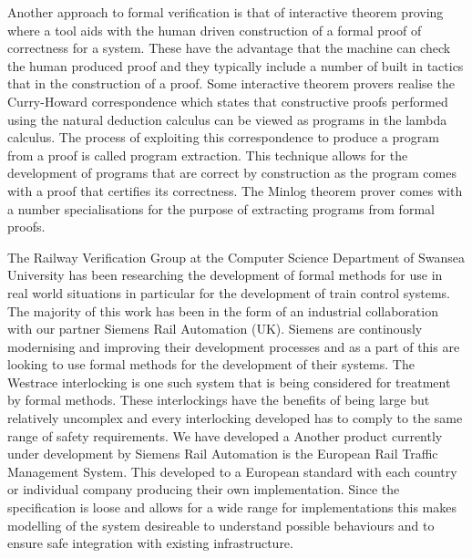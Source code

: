Another approach to formal verification is that of interactive theorem proving where a tool aids with the human driven construction of a formal proof of correctness for a system. These have the advantage that the machine can check the human produced proof and they typically include a number of built in tactics that in the construction of a proof. Some interactive theorem provers realise the Curry-Howard correspondence \cite{} which states that constructive proofs performed using the natural deduction calculus can be viewed as programs in the lambda calculus.  The process of exploiting this correspondence to produce a program from a proof is called program extraction. This technique allows for the development of programs that are correct by construction as the program comes with a proof that certifies its correctness. The Minlog theorem prover comes with a number specialisations for the purpose of extracting programs from formal proofs.
\begin{comment}
\textbf{Note: Add something about program extraction here.}
Alternatively to automatic techniques for verification there are also interactive theorem provers which employ man-machine collaboration in order to prove properties over a system.
Program extraction is another verification technique which allows the production of correct by construction computer programs. It is based around the Curry-Howard correspondence \cite{} which states that constructive proofs performed using the natural deduction calculus can be viewed as programs in the lambda calculus. 
\end{comment}


The Railway Verification Group at the Computer Science Department of Swansea University has been researching the development of formal methods for use in real world situations in particular for the development of train control systems. The majority of this work has been in the form of an industrial collaboration with our partner Siemens Rail Automation (UK). Siemens are continously modernising and improving their development processes and as a part of this are looking to use formal methods for the development of their systems. The Westrace interlocking is one such system that is being considered for treatment by formal methods. These interlockings have the benefits of being large but relatively uncomplex and every interlocking developed has to comply to the same range of safety requirements.  We have developed a Another product currently under development by Siemens Rail Automation is the European Rail Traffic Management System. This developed to a European  standard with each country or individual company producing their own implementation. Since the specification is loose and allows for a wide range for implementations this makes modelling of the system desireable to understand possible behaviours and to ensure safe integration with existing infrastructure.





